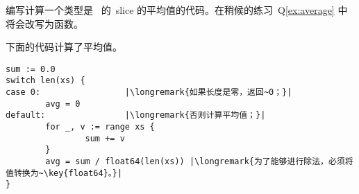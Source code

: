 \begin{Exercise}[title={平均值},difficulty=1]
\label{ex:average no func}
\Question\label{ex:average no func q1} 编写计算一个类型是~
 的~slice 的平均值的代码。在稍候的练习~Q\ref{ex:average} 
中将会改写为函数。
\end{Exercise}

\begin{Answer}
\Question 下面的代码计算了平均值。
\begin{lstlisting}
sum := 0.0 
switch len(xs) {
case 0:                 |\longremark{如果长度是零，返回~0；}|
        avg = 0
default:                |\longremark{否则计算平均值；}|
        for _, v := range xs {
                sum += v
        }
        avg = sum / float64(len(xs)) |\longremark{为了能够进行除法，必须将值转换为~\key{float64}。}|
}
\end{lstlisting}
\showremarks
\end{Answer}

